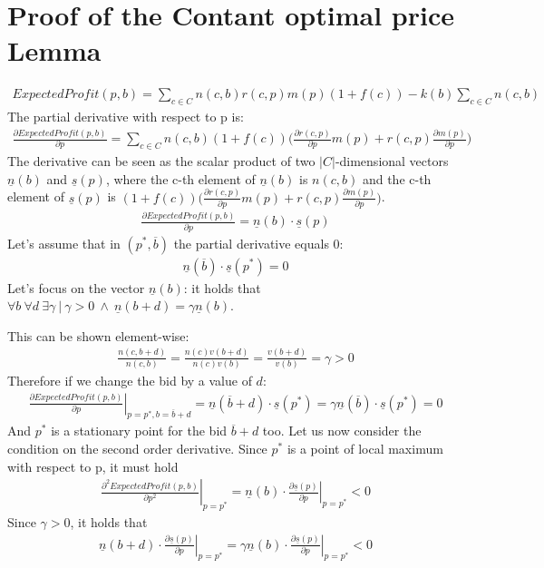 \documentclass[11pt]{article} %
\begin{document}
\section{Proof of the Contant optimal price Lemma}\label{sec.ConstOptPrice}
\begin{align*}
ExpectedProfit(p,b)=\sum_{c \in C}{n(c,b)r(c,p)m(p)(1+f(c))}-k(b)\sum_{c \in C}{n(c,b)}
\end{align*}
The partial derivative with respect to p is:
\begin{align*}
\frac{\partial ExpectedProfit(p,b)}{\partial p}=\sum_{c \in C}{n(c,b)(1+f(c))\bigg(\frac{\partial r(c,p)}{\partial p}m(p) + r(c,p)\frac{\partial m(p)}{\partial p}\bigg)}
\end{align*}
The derivative can be seen as the scalar product of two $|C|$-dimensional vectors $\underline n(b)$ and $\underline s(p)$, where the c-th element of $\underline n(b)$ is $n(c,b)$ and the c-th element of $\underline s(p)$ is $(1+f(c))\bigg(\frac{\partial r(c,p)}{\partial p}m(p) + r(c,p)\frac{\partial m(p)}{\partial p}\bigg)$.
\begin{align*}
\frac{\partial ExpectedProfit(p,b)}{\partial p}=\underline n(b)\cdot \underline s(p)
\end{align*}
Let's assume that in $(p^*, \overline b)$ the partial derivative equals 0:
\begin{align*}
\underline n(\overline b)\cdot \underline s(p^*) = 0
\end{align*}
Let's focus on the vector $\underline n(b)$: it holds that $\forall b \ \forall d \ \exists \gamma \  | \ \gamma > 0\  \wedge \   \underline n(b + d)=\gamma\underline n(b)$.

This can be shown element-wise:
\begin{align*}
\frac{n(c, b+d)}{n(c,b)} = \frac{n(c)v(b+d)}{n(c)v(b)} = \frac{v(b+d)}{v(b)} = \gamma > 0
\end{align*}
Therefore if we change the bid by a value of $d$:
\begin{align*}
\left.\frac{\partial ExpectedProfit(p,b)}{\partial p}\right\rvert_{p=p^*, b=\overline b+d}=\underline n(\overline b+d)\cdot \underline s(p^*) = \gamma \underline n(\overline b)\cdot \underline s(p^*) = 0
\end{align*}
And $p^*$ is a stationary point for the bid $\overline b+d$ too.
\newline
\newline
Let us now consider the condition on the second order derivative. Since $p^*$ is a point of local maximum with respect to p, it must hold
\begin{align*}
\left. \frac{\partial^2 ExpectedProfit(p,b)}{\partial p^2}\right \rvert_{p=p^*}=\underline n(b)\cdot \left. \frac{\partial \underline s(p)}{\partial p}\right \rvert_{p=p^*} < 0
\end{align*}
Since $\gamma > 0 $, it holds that
\begin{align*}
\underline n(b+d)\cdot \left. \frac{\partial \underline s(p)}{\partial p}\right \rvert_{p=p^*}= \gamma \underline n(b)\cdot \left. \frac{\partial \underline s(p)}{\partial p}\right \rvert_{p=p^*} < 0 
\end{align*}
\end{document}
